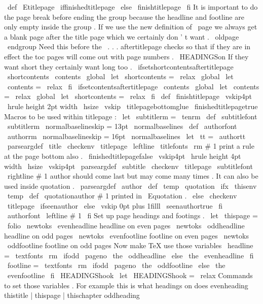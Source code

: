 \
def
\
Etitlepage
{
%
\
iffinishedtitlepage
\
else
\
finishtitlepage
\
fi
%
It
is
important
to
do
the
page
break
before
ending
the
group
%
because
the
headline
and
footline
are
only
empty
inside
the
group
.
%
If
we
use
the
new
definition
of
\
page
we
always
get
a
blank
page
%
after
the
title
page
which
we
certainly
don
'
t
want
.
\
oldpage
\
endgroup
%
%
Need
this
before
the
\
.
.
.
aftertitlepage
checks
so
that
if
they
are
%
in
effect
the
toc
pages
will
come
out
with
page
numbers
.
\
HEADINGSon
%
%
If
they
want
short
they
certainly
want
long
too
.
\
ifsetshortcontentsaftertitlepage
\
shortcontents
\
contents
\
global
\
let
\
shortcontents
=
\
relax
\
global
\
let
\
contents
=
\
relax
\
fi
%
\
ifsetcontentsaftertitlepage
\
contents
\
global
\
let
\
contents
=
\
relax
\
global
\
let
\
shortcontents
=
\
relax
\
fi
}
\
def
\
finishtitlepage
{
%
\
vskip4pt
\
hrule
height
2pt
width
\
hsize
\
vskip
\
titlepagebottomglue
\
finishedtitlepagetrue
}
%
%
%
Macros
to
be
used
within
titlepage
:
\
let
\
subtitlerm
=
\
tenrm
\
def
\
subtitlefont
{
\
subtitlerm
\
normalbaselineskip
=
13pt
\
normalbaselines
}
\
def
\
authorfont
{
\
authorrm
\
normalbaselineskip
=
16pt
\
normalbaselines
\
let
\
tt
=
\
authortt
}
\
parseargdef
\
title
{
%
\
checkenv
\
titlepage
\
leftline
{
\
titlefonts
\
rm
#
1
}
%
print
a
rule
at
the
page
bottom
also
.
\
finishedtitlepagefalse
\
vskip4pt
\
hrule
height
4pt
width
\
hsize
\
vskip4pt
}
\
parseargdef
\
subtitle
{
%
\
checkenv
\
titlepage
{
\
subtitlefont
\
rightline
{
#
1
}
}
%
}
%
author
should
come
last
but
may
come
many
times
.
%
It
can
also
be
used
inside
quotation
.
%
\
parseargdef
\
author
{
%
\
def
\
temp
{
\
quotation
}
%
\
ifx
\
thisenv
\
temp
\
def
\
quotationauthor
{
#
1
}
%
printed
in
\
Equotation
.
\
else
\
checkenv
\
titlepage
\
ifseenauthor
\
else
\
vskip
0pt
plus
1filll
\
seenauthortrue
\
fi
{
\
authorfont
\
leftline
{
#
1
}
}
%
\
fi
}
%
%
%
Set
up
page
headings
and
footings
.
\
let
\
thispage
=
\
folio
\
newtoks
\
evenheadline
%
headline
on
even
pages
\
newtoks
\
oddheadline
%
headline
on
odd
pages
\
newtoks
\
evenfootline
%
footline
on
even
pages
\
newtoks
\
oddfootline
%
footline
on
odd
pages
%
Now
make
TeX
use
those
variables
\
headline
=
{
{
\
textfonts
\
rm
\
ifodd
\
pageno
\
the
\
oddheadline
\
else
\
the
\
evenheadline
\
fi
}
}
\
footline
=
{
{
\
textfonts
\
rm
\
ifodd
\
pageno
\
the
\
oddfootline
\
else
\
the
\
evenfootline
\
fi
}
\
HEADINGShook
}
\
let
\
HEADINGShook
=
\
relax
%
Commands
to
set
those
variables
.
%
For
example
this
is
what
headings
on
does
%
evenheading
thistitle
|
thispage
|
thischapter
%
oddheading
